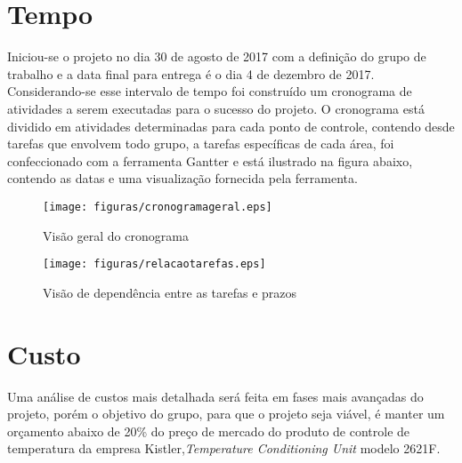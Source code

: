 \section{Tempo}

Iniciou-se o projeto no dia 30 de agosto de 2017 com a definição do grupo de trabalho e a data final para entrega é o dia 4 de dezembro de 2017. Considerando-se esse intervalo de tempo foi construído um cronograma de atividades a serem executadas para o sucesso do projeto.
O cronograma está dividido em atividades determinadas para cada ponto de controle, contendo desde tarefas que envolvem todo grupo, a tarefas específicas de cada área, foi confeccionado com a ferramenta Gantter e está ilustrado na figura abaixo, contendo as datas e uma visualização fornecida pela ferramenta.

\begin{figure}[!htb]
   \centering
   \texttt{[image: figuras/cronogramageral.eps]}
   \caption{Visão geral do cronograma}
\end{figure}


\begin{figure}[!htb]
   \centering
   \texttt{[image: figuras/relacaotarefas.eps]}
   \caption{Visão de dependência entre as tarefas e prazos}
\end{figure}

\section{Custo}
Uma análise de custos mais detalhada será feita em fases mais avançadas do projeto, porém o objetivo do grupo, para que o projeto seja viável, é manter um orçamento abaixo de 20\% do preço de mercado do produto de controle de temperatura da empresa Kistler,\textsl{Temperature Conditioning Unit} modelo 2621F.

          


